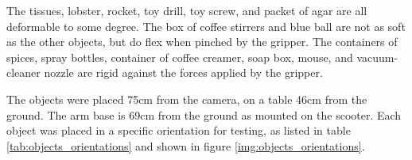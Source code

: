 \documentclass[letterpaper, 10 pt, conference]{ieeeconf}
\begin{document}
The tissues, lobster, rocket, toy drill, toy screw, and packet of agar are all deformable to some degree. 
The box of coffee stirrers and blue ball are not as soft as the other objects, but do flex when pinched by the gripper. 
The containers of spices, spray bottles, container of coffee creamer, soap box, mouse, and vacuum-cleaner nozzle are rigid against the forces applied by the gripper. 

The objects were placed 75cm from the camera, on a table 46cm from the ground. The arm base is 69cm from the ground as mounted on the scooter. Each object was placed in a specific orientation for testing, as listed in table \ref{tab:objects_orientations} and shown in figure \ref{img:objects_orientations}.

\end{document}
